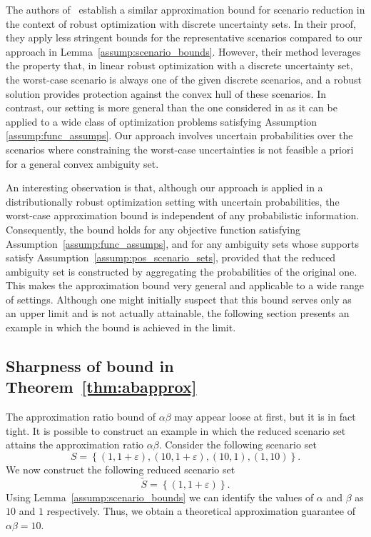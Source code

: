 \documentclass{article}
\begin{document}
	
The authors of~\cite{goerigk_scen_reduction} establish a similar approximation bound for scenario reduction in the context of robust optimization with discrete uncertainty sets.
In their proof, they apply less stringent bounds for the representative scenarios compared to our approach in Lemma~\ref{assump:scenario_bounds}.
However, their method leverages the property that, in linear robust optimization with a discrete uncertainty set, the worst-case scenario is always one of the given discrete scenarios, and a robust solution provides protection against the convex hull of these scenarios.
In contrast, our setting is more general than the one considered in \cite{goerigk_scen_reduction} as it can be applied to a wide class of optimization problems satisfying Assumption \ref{assump:func_assumps}.
Our approach involves uncertain probabilities over the scenarios where constraining the worst-case uncertainties is not feasible a priori for a general convex ambiguity set.


An interesting observation is that, although our approach is applied in a distributionally robust optimization setting with uncertain probabilities, the worst-case approximation bound is independent of any probabilistic information.
Consequently, the bound holds for any objective function satisfying Assumption~\ref{assump:func_assumps}, and for any ambiguity sets whose supports satisfy Assumption~\ref{assump:pos_scenario_sets}, provided that the reduced ambiguity set is constructed by aggregating the probabilities of the original one.
This makes the approximation bound very general and applicable to a wide range of settings.
Although one might initially suspect that this bound serves only as an upper limit and is not actually attainable, the following section presents an example in which the bound is achieved in the limit.




\subsection{Sharpness of bound in Theorem~\ref{thm:abapprox}}
The approximation ratio bound of $\alpha \beta$ may appear loose at first, but it is in fact tight.
It is possible to construct an example in which the reduced scenario set attains the approximation ratio $\alpha \beta$.
Consider the following scenario set
\[
S = \left\{
(1, 1+\varepsilon),
(10, 1+\varepsilon),
(10, 1),
(1, 10)
\right\}.
\]
We now construct the following reduced scenario set
\[
\tilde{S} = \left\{
(1, 1+\varepsilon)
\right\}.
\]
Using Lemma~\ref{assump:scenario_bounds} we can identify the values of $\alpha$ and $\beta$ as $10$ and $1$ respectively. 
Thus, we obtain a theoretical approximation guarantee of $\alpha \beta = 10$.
\end{document}
